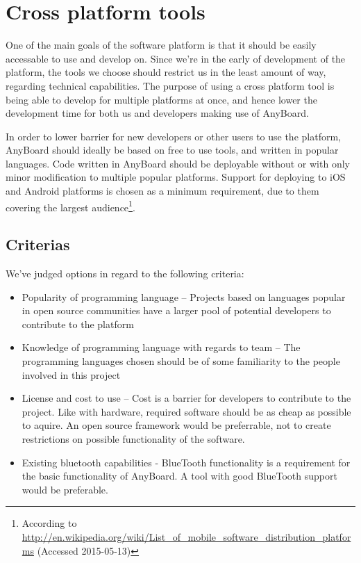 \section{Cross platform tools} \label{sec:cpt}
One of the main goals of the software platform is that it should be easily accessable to use and develop on. Since we're in the early of development of the platform, the tools we choose should restrict us in the least amount of way, regarding technical capabilities. The purpose of using a cross platform tool is being able to develop for multiple platforms at once, and hence lower the development time for both us and developers making use of AnyBoard.

In order to lower barrier for new developers or other users to use the platform, AnyBoard should ideally be based on free to use tools, and written in popular languages. Code written in AnyBoard should be deployable without or with only minor modification to multiple popular platforms. Support for deploying to iOS and Android platforms is chosen as a minimum requirement, due to them covering the largest audience\footnote{According to \href{http://en.wikipedia.org/wiki/List_of_mobile_software_distribution_platforms}{http://en.wikipedia.org/wiki/List\_of\_mobile\_software\_distribution\_platforms} (Accessed 2015-05-13)}.

\subsection{Criterias}
We've judged options in regard to the following criteria:
\begin{itemize}
\item{Popularity of programming language – Projects based on languages popular in open source communities have a larger pool of potential developers to contribute to the platform}
\item{Knowledge of programming language with regards to team – The programming languages chosen should be of some familiarity to the people involved in this project }
\item{License and cost to use – Cost is a barrier for developers to contribute to the project. Like with hardware, required software should be as cheap as possible to aquire. An open source framework would be preferrable, not to create restrictions on possible functionality of the software.}
\item{Existing bluetooth capabilities - BlueTooth functionality is a requirement for the basic functionality of AnyBoard. A tool with good BlueTooth support would be preferable.}
\end{itemize}

